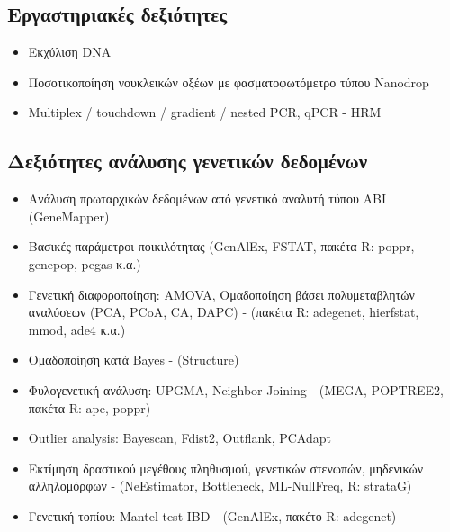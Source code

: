 \documentclass[12pt,]{scrartcl}
\begin{document}

\subsection{Εργαστηριακές δεξιότητες}\label{lab}
\begin{itemize}
\vspace{-3mm}
\setlength\itemsep{-0.6em}
\item Εκχύλιση DNA%
\item Ποσοτικοποίηση νουκλεικών οξέων με φασματοφωτόμετρο τύπου Nanodrop
\item Multiplex / touchdown / gradient / nested PCR, qPCR - HRM
\end{itemize}

\subsection{Δεξιότητες ανάλυσης γενετικών δεδομένων}\label{genetics}
\begin{itemize}
\vspace{-3mm}
\setlength\itemsep{-0.6em}
\item Ανάλυση πρωταρχικών δεδομένων από γενετικό αναλυτή τύπου ΑΒΙ (GeneMapper)
\item Βασικές παράμετροι ποικιλότητας (GenAlEx, FSTAT, πακέτα R: poppr, genepop, pegas κ.α.)
\item Γενετική διαφοροποίηση: AMOVA, Ομαδοποίηση βάσει πολυμεταβλητών αναλύσεων (PCA, PCoA, CA, DAPC) - (πακέτα R: adegenet, hierfstat, mmod, ade4 κ.α.)
\item Ομαδοποίηση κατά Bayes - (Structure)
\item Φυλογενετική ανάλυση: UPGMA, Neighbor-Joining - (MEGA, POPTREE2, πακέτα R: ape, poppr)
\item Outlier analysis: Bayescan, Fdist2, Outflank, PCAdapt
\item Εκτίμηση δραστικού μεγέθους πληθυσμού, γενετικών στενωπών, μηδενικών αλληλομόρφων - (NeEstimator, Bottleneck, ML-NullFreq, R: strataG)
\item Γενετική τοπίου: Mantel test IBD - (GenAlEx, πακέτο R: adegenet)

\end{itemize}
\end{document}
